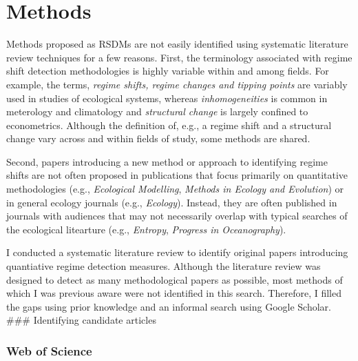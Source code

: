 \documentclass[12pt,twoside,openany]{reedthesis}
\begin{document}
\section{Methods}\label{methods}

Methods proposed as RSDMs are not easily identified using systematic
literature review techniques for a few reasons. First, the terminology
associated with regime shift detection methodologies is highly variable
within and among fields. For example, the terms, \emph{regime shifts,
regime changes and tipping points} are variably used in studies of
ecological systems, whereas \emph{inhomogeneities} is common in
meterology and climatology and \emph{structural change} is largely
confined to econometrics. Although the definition of, e.g., a regime
shift and a structural change vary across and within fields of study,
some methods are shared.

Second, papers introducing a new method or approach to identifying
regime shifts are not often proposed in publications that focus
primarily on quantitative methodologies (e.g., \emph{Ecological
Modelling}, \emph{Methods in Ecology and Evolution}) or in general
ecology journals (e.g., \emph{Ecology}). Instead, they are often
published in journals with audiences that may not necessarily overlap
with typical searches of the ecological litearture (e.g.,
\emph{Entropy}, \emph{Progress in Oceanography}).

I conducted a systematic literature review to identify original papers
introducing quantiative regime detection measures. Although the
literature review was designed to detect as many methodological papers
as possible, most methods of which I was previous aware were not
identified in this search. Therefore, I filled the gaps using prior
knowledge and an informal search using Google Scholar. \#\#\#
Identifying candidate articles

\subsubsection{Web of Science}\label{web-of-science}
\end{document}
